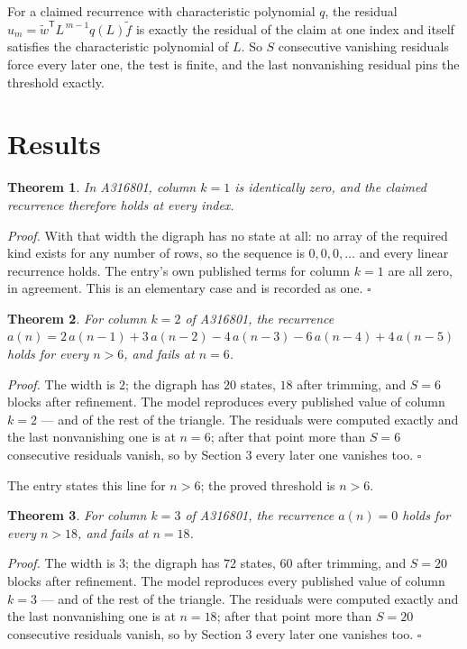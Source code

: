 \documentclass[11pt]{article}
\newtheorem{theorem}{Theorem}
\theoremstyle{definition}
\begin{document}
For a claimed recurrence with characteristic polynomial $q$, the residual $u_m = \tilde w^{\mathsf T}L^{\,m-1}q(L)\tilde f$ is exactly the residual of the claim at one index and itself satisfies the characteristic polynomial of $L$. So $S$ consecutive vanishing residuals force every later one, the test is finite, and the last nonvanishing residual pins the threshold exactly.

\section{Results}

\begin{theorem} In A316801, column $k = 1$ is identically zero, and the claimed recurrence therefore holds at every index.\end{theorem}

{\itshape Proof.} With that width the digraph has no state at all: no array of the required kind exists for any number of rows, so the sequence is $0,0,0,\dots$ and every linear recurrence holds. The entry's own published terms for column $k = 1$ are all zero, in agreement. This is an elementary case and is recorded as one. $\square$

\begin{theorem} For column $k = 2$ of A316801, the recurrence $a(n) = 2\,a(n-1) + 3\,a(n-2) - 4\,a(n-3) - 6\,a(n-4) + 4\,a(n-5)$ holds for every $n > 6$, and fails at $n = 6$.\end{theorem}

{\itshape Proof.} The width is $2$; the digraph has $20$ states, $18$ after trimming, and $S = 6$ blocks after refinement. The model reproduces every published value of column $k = 2$ --- and of the rest of the triangle. The residuals were computed exactly and the last nonvanishing one is at $n = 6$; after that point more than $S = 6$ consecutive residuals vanish, so by Section 3 every later one vanishes too. $\square$

The entry states this line for $n > 6$; the proved threshold is $n > 6$.

\begin{theorem} For column $k = 3$ of A316801, the recurrence $a(n) = 0$ holds for every $n > 18$, and fails at $n = 18$.\end{theorem}

{\itshape Proof.} The width is $3$; the digraph has $72$ states, $60$ after trimming, and $S = 20$ blocks after refinement. The model reproduces every published value of column $k = 3$ --- and of the rest of the triangle. The residuals were computed exactly and the last nonvanishing one is at $n = 18$; after that point more than $S = 20$ consecutive residuals vanish, so by Section 3 every later one vanishes too. $\square$
\end{document}

